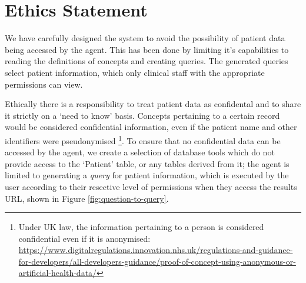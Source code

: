 \documentclass[11pt]{article}
\begin{document}
\section{Ethics Statement}
We have carefully designed the system to avoid the possibility of patient data being accessed by the agent.
This has been done by limiting it's capabilities to reading the definitions of concepts and creating queries.
The generated queries select patient information, which only clinical staff with the appropriate permissions can view.

Ethically there is a responsibility to treat patient data as confidental and to share it strictly on a `need to know' basis.
Concepts pertaining to a certain record would be considered confidential information, even if the patient name and other identifiers were pseudonymised
\footnote{Under UK law, the information pertaining to a person is considered confidential even if it is anonymised: \\
\tiny
\url{
https://www.digitalregulations.innovation.nhs.uk/regulations-and-guidance-for-developers/all-developers-guidance/proof-of-concept-using-anonymous-or-artificial-health-data/}
}. 
To ensure that no confidential data can be accessed by the agent, we create a selection of database tools which do not provide access to the `Patient' table, or any tables derived from it; the agent is limited to generating a \textit{query} for patient information, which is executed by the user according to their resective level of permissions when they access the results URL, shown in Figure \ref{fig:question-to-query}.




\end{document}
